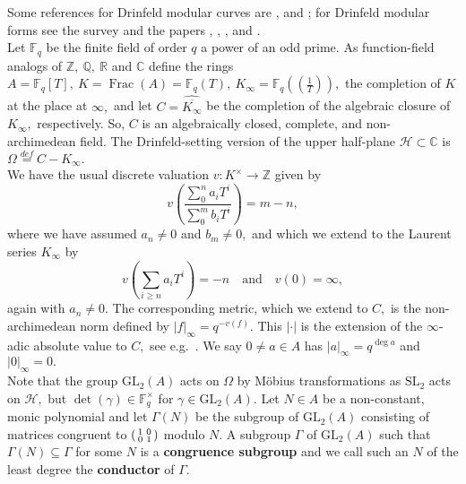 \documentclass[11pt]{amsart}
\theoremstyle{definition}
\newenvironment{psmallmatrix}
{\left(\begin{smallmatrix}}
	{\end{smallmatrix}\right)}
\numberwithin{equation}{section}
\newcommand{\GL}{\mathrm{GL}} 	%
\newcommand{\SL}{\mathrm{SL}} 	%
\newcommand{\cH}{\mathcal{H}}		%
\newcommand{\bbC}{\mathbb{C}}		%
\newcommand{\bbF}{\mathbb{F}}		%
\newcommand{\bbQ}{\mathbb{Q}}		%
\newcommand{\bbR}{\mathbb{R}}		%
\newcommand{\bbZ}{\mathbb{Z}}		%
\begin{document}
		Some references for Drinfeld modular curves are \cite{Gekeler-Curves}, \cite{Gekeler-Invariants} and \cite{Mason-Schweizer-elliptic-pts-Drinfeld-modular-grps}; for Drinfeld modular forms see the survey \cite{Gekeler-survey-Drinfeld-modular-forms} and the papers \cite{Gekeler-jacobians}, \cite{Gekeler-Coeff}, \cite{Breuer-Gekeler-h-function}, \cite{Cornelissen-lvlT} and \cite{Dalal-Kumar-Gamma_0(T)-structure}.\\
		
		Let $\bbF_q$ be the finite field of order $q$ a power of an odd prime. As function-field analogs of $\bbZ,~\bbQ,~\bbR$ and $\bbC$ define the rings $\displaystyle{A=\bbF_q[T], ~K=\operatorname{Frac}(A)=\bbF_q(T), ~K_{\infty}=\bbF_q\left(\!\left(\frac{1}{T}\right)\!\right)},$ the completion of $K$ at the place at $\infty,$ and let $C=\widehat{\overline{K_{\infty}}}$ be the completion of the algebraic closure of $K_{\infty},$ respectively. So, $C$ is an algebraically closed, complete, and non-archimedean field. The Drinfeld-setting version of the upper half-plane $\cH\subset \bbC$ is $\Omega\overset{def}{=}C-K_{\infty}.$ \\
		
		We have the usual discrete valuation $v: K^{\times}\to \bbZ$ given by 
		\[v\left(\frac{\sum_0^n a_iT^i}{\sum_0^m b_iT^i}\right)=m-n,\] where we have assumed $a_n\neq 0$ and $b_m\neq 0,$ and which we extend to the Laurent series $K_{\infty}$ by 
		\[v\left(\sum_{i\geq n}a_iT^i\right)=-n\quad\text{and}\quad v(0)=\infty,\] again with $a_n\neq 0.$ The corresponding metric, which we extend to $C,$ is the non-archimedean norm defined by $|f|_{\infty}=q^{-v(f)}.$ This $|\cdot|$ is the extension of the $\infty$-adic absolute value to $C,$ see e.g.\ \cite[Section $(2.2)$]{Poonen-DrinfeldIntro}. We say $0\neq a\in A$ has $|a|_{\infty}=q^{\deg a}$ and $|0|_{\infty}=0.$ \\
		
		
		Note that the group $\GL_2(A)$ acts on $\Omega$ by M\"obius transformations as $\SL_2$ acts on $\cH,$ but $\det(\gamma)\in \bbF_q^{\times}$ for $\gamma\in \GL_2(A).$ Let $N\in A$ be a non-constant, monic polynomial and let $\Gamma(N)$ be the subgroup of $\GL_2(A)$ consisting of matrices congruent to $\begin{psmallmatrix}1&0\\0&1\end{psmallmatrix}$ modulo $N.$ A subgroup $\Gamma$ of $\GL_2(A)$ such that $\Gamma(N)\subseteq \Gamma$ for some $N$ is a \textbf{congruence subgroup} and we call such an $N$ of the least degree the \textbf{conductor} of $\Gamma.$ \\
		
\end{document}
